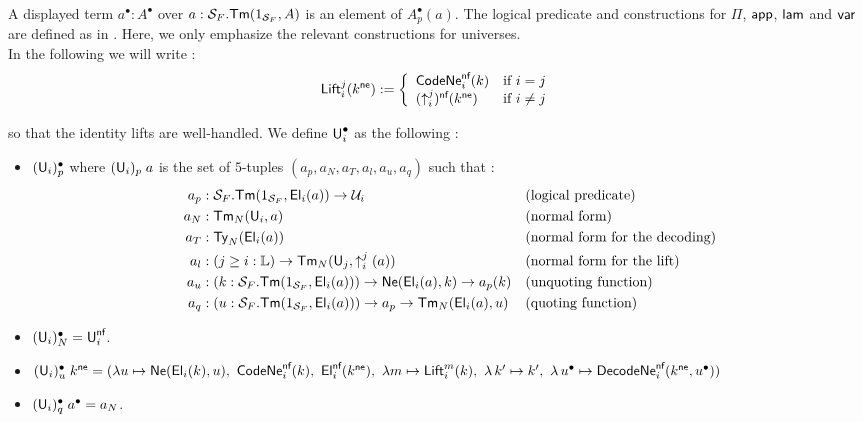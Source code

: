 \documentclass{article}
\begin{document}
A displayed term $a^\bullet : A^\bullet$ over $a : \mathcal{S}_F.\textsf{Tm}(1_{\mathcal{S}_F},A)$ is an element of $A_p^\bullet(a)$.
The logical predicate and constructions for $\Pi$, $\textsf{app}$, $\textsf{lam}$ and $\textsf{var}$ are defined as in \cite{sconing}. Here, we only emphasize the relevant
constructions for universes.\\

        In the following we will write :
        \[
            \mathsf{Lift}_i^j(k^{\textsf{ne}}) := 
            \left\{\begin{array}{lr}
                    \mathsf{CodeNe}^{\textsf{nf}}_i(k) & \text{if } i=j \\
            (\uparrow_i^j)^{\textsf{nf}}(k^{\textsf{ne}}) & \text{if } i \neq j
            \end{array}\right. 
        \] 

        so that the identity lifts are well-handled. We define $\textsf{U}_i^\bullet$ as the following :
            \begin{itemize}
                \item $(\textsf{U}_i)_p^\bullet$ where $(\textsf{U}_i)_p\; a$ is the set of $5$-tuples $(a_p,a_N,a_T,a_l,a_u,a_q)$ such that :
                    \begin{align*}
                        a_p &: \mathcal{S}_F.\textsf{Tm}(1_{\mathcal{S}_F},\textsf{El}_i(a)) \rightarrow \mathcal{U}_i && \text{(logical predicate)}\\
                        a_N &: \textsf{Tm}_N(\textsf{U}_i,a) && \text{(normal form)}\\
                        a_T &: \textsf{Ty}_N(\textsf{El}_i(a)) && \text{(normal form for the decoding)}\\
                        a_l &: (j \geq i : \mathbb{L}) \rightarrow \textsf{Tm}_N(\textsf{U}_j,\uparrow_i^j(a)) && \text{(normal form for the lift)}\\
                        a_u &: (k: \mathcal{S}_F.\textsf{Tm}(1_{\mathcal{S}_F},\textsf{El}_i(a))) \rightarrow \textsf{Ne}(\textsf{El}_i(a),k) \rightarrow a_p(k)&& \text{(unquoting function)}\\ 
                        a_q &: (u: \mathcal{S}_F.\textsf{Tm}(1_{\mathcal{S}_F},\textsf{El}_i(a))) \rightarrow a_p \rightarrow \textsf{Tm}_N(\textsf{El}_i(a),u) && \text{(quoting function)} 
                    \end{align*}

                \item $(\textsf{U}_i)_N^\bullet = \textsf{U}_i^{\textsf{nf}}$.

                \item $(\U_i)_u^\bullet \;  k^\neut = (\lambda u \mapsto \Neut(\El_i(k),u),\ \mathsf{CodeNe}^\nf_i(k), \ \El_i^\nf(k^\neut), \ \lambda m \mapsto \mathsf{Lift}_i^m(k), \ \lambda \, k' \mapsto k',\ \lambda \, u^\bullet \mapsto \mathsf{DecodeNe}^\nf_i (k^\neut, u^\bullet))$ 

                \item $(\textsf{U}_i)_q^\bullet \; a^\bullet = a_N$.

            \end{itemize}
\end{document}
